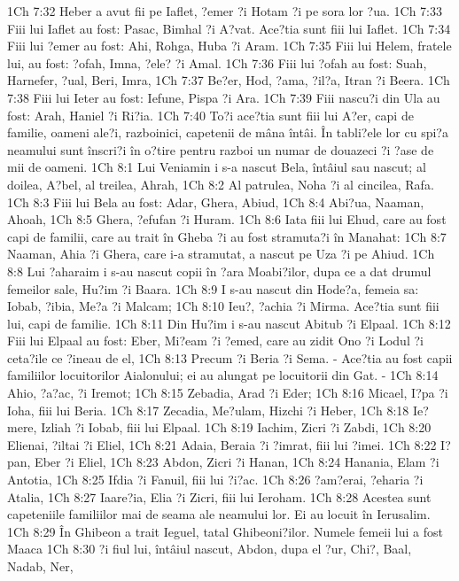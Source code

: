 1Ch 7:32  Heber a avut fii pe Iaflet, ?emer ?i Hotam ?i pe sora lor ?ua.
1Ch 7:33  Fiii lui Iaflet au fost: Pasac, Bimhal ?i A?vat. Ace?tia sunt fiii lui Iaflet.
1Ch 7:34  Fiii lui ?emer au fost: Ahi, Rohga, Huba ?i Aram.
1Ch 7:35  Fiii lui Helem, fratele lui, au fost: ?ofah, Imna, ?ele? ?i Amal.
1Ch 7:36  Fiii lui ?ofah au fost: Suah, Harnefer, ?ual, Beri, Imra,
1Ch 7:37  Be?er, Hod, ?ama, ?il?a, Itran ?i Beera.
1Ch 7:38  Fiii lui Ieter au fost: Iefune, Pispa ?i Ara.
1Ch 7:39  Fiii nascu?i din Ula au fost: Arah, Haniel ?i Ri?ia.
1Ch 7:40  To?i ace?tia sunt fiii lui A?er, capi de familie, oameni ale?i, razboinici, capetenii de mâna întâi. În tabli?ele lor cu spi?a neamului sunt înscri?i în o?tire pentru razboi un numar de douazeci ?i ?ase de mii de oameni.
1Ch 8:1  Lui Veniamin i s-a nascut Bela, întâiul sau nascut; al doilea, A?bel, al treilea, Ahrah,
1Ch 8:2  Al patrulea, Noha ?i al cincilea, Rafa.
1Ch 8:3  Fiii lui Bela au fost: Adar, Ghera, Abiud,
1Ch 8:4  Abi?ua, Naaman, Ahoah,
1Ch 8:5  Ghera, ?efufan ?i Huram.
1Ch 8:6  Iata fiii lui Ehud, care au fost capi de familii, care au trait în Gheba ?i au fost stramuta?i în Manahat:
1Ch 8:7  Naaman, Ahia ?i Ghera, care i-a stramutat, a nascut pe Uza ?i pe Ahiud.
1Ch 8:8  Lui ?aharaim i s-au nascut copii în ?ara Moabi?ilor, dupa ce a dat drumul femeilor sale, Hu?im ?i Baara.
1Ch 8:9  I s-au nascut din Hode?a, femeia sa: Iobab, ?ibia, Me?a ?i Malcam;
1Ch 8:10  Ieu?, ?achia ?i Mirma. Ace?tia sunt fiii lui, capi de familie.
1Ch 8:11  Din Hu?im i s-au nascut Abitub ?i Elpaal.
1Ch 8:12  Fiii lui Elpaal au fost: Eber, Mi?eam ?i ?emed, care au zidit Ono ?i Lodul ?i ceta?ile ce ?ineau de el,
1Ch 8:13  Precum ?i Beria ?i Sema. - Ace?tia au fost capii familiilor locuitorilor Aialonului; ei au alungat pe locuitorii din Gat. -
1Ch 8:14  Ahio, ?a?ac, ?i Iremot;
1Ch 8:15  Zebadia, Arad ?i Eder;
1Ch 8:16  Micael, I?pa ?i Ioha, fiii lui Beria.
1Ch 8:17  Zecadia, Me?ulam, Hizchi ?i Heber,
1Ch 8:18  Ie?mere, Izliah ?i Iobab, fiii lui Elpaal.
1Ch 8:19  Iachim, Zicri ?i Zabdi,
1Ch 8:20  Elienai, ?iltai ?i Eliel,
1Ch 8:21  Adaia, Beraia ?i ?imrat, fiii lui ?imei.
1Ch 8:22  I?pan, Eber ?i Eliel,
1Ch 8:23  Abdon, Zicri ?i Hanan,
1Ch 8:24  Hanania, Elam ?i Antotia,
1Ch 8:25  Ifdia ?i Fanuil, fiii lui ?i?ac.
1Ch 8:26  ?am?erai, ?eharia ?i Atalia,
1Ch 8:27  Iaare?ia, Elia ?i Zicri, fiii lui Ieroham.
1Ch 8:28  Acestea sunt capeteniile familiilor mai de seama ale neamului lor. Ei au locuit în Ierusalim.
1Ch 8:29  În Ghibeon a trait Ieguel, tatal Ghibeoni?ilor. Numele femeii lui a fost Maaca
1Ch 8:30  ?i fiul lui, întâiul nascut, Abdon, dupa el ?ur, Chi?, Baal, Nadab, Ner,
